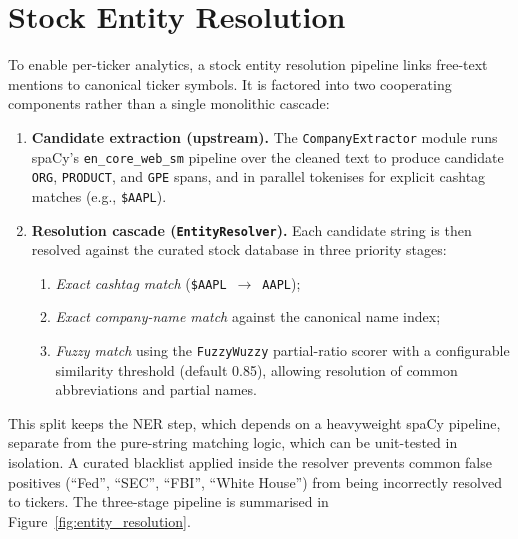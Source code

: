 \section{Stock Entity Resolution}
\label{sec:entity_design}

To enable per-ticker analytics, a stock entity resolution pipeline links free-text mentions to canonical ticker symbols. It is factored into two cooperating components rather than a single monolithic cascade:

\begin{enumerate}
    \item \textbf{Candidate extraction (upstream).} The \texttt{CompanyExtractor} module runs spaCy's \texttt{en\_core\_web\_sm} pipeline over the cleaned text to produce candidate \texttt{ORG}, \texttt{PRODUCT}, and \texttt{GPE} spans, and in parallel tokenises for explicit cashtag matches (e.g., \texttt{\$AAPL}).
    \item \textbf{Resolution cascade (\texttt{EntityResolver}).} Each candidate string is then resolved against the curated stock database in three priority stages:
    \begin{enumerate}
        \item \textit{Exact cashtag match} (\texttt{\$AAPL}~$\rightarrow$~\texttt{AAPL});
        \item \textit{Exact company-name match} against the canonical name index;
        \item \textit{Fuzzy match} using the \texttt{FuzzyWuzzy} partial-ratio scorer with a configurable similarity threshold (default 0.85), allowing resolution of common abbreviations and partial names.
    \end{enumerate}
\end{enumerate}

This split keeps the NER step, which depends on a heavyweight spaCy pipeline, separate from the pure-string matching logic, which can be unit-tested in isolation. A curated blacklist applied inside the resolver prevents common false positives (``Fed'', ``SEC'', ``FBI'', ``White House'') from being incorrectly resolved to tickers.  The three-stage pipeline is summarised in Figure~\ref{fig:entity_resolution}.

